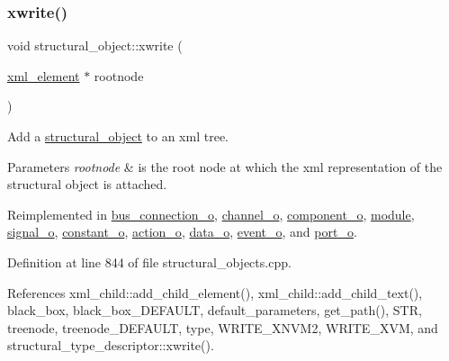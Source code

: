 \mbox{\label{classstructural__object_a7b0b509094451578b2dc10a9b716b16e}} 
\subsubsection{\texorpdfstring{xwrite()}{xwrite()}}
{\footnotesize\ttfamily void structural\+\_\+object\+::xwrite (\begin{DoxyParamCaption}\item[{\hyperlink{classxml__element}{xml\+\_\+element} $\ast$}]{rootnode }\end{DoxyParamCaption})\hspace{0.3cm}{\ttfamily [virtual]}}



Add a \hyperlink{classstructural__object}{structural\+\_\+object} to an xml tree. 


\begin{DoxyParams}{Parameters}
{\em rootnode} & is the root node at which the xml representation of the structural object is attached. \\
\hline
\end{DoxyParams}


Reimplemented in \hyperlink{classbus__connection__o_acb507e284b971944f09b6b26264dc0cf}{bus\+\_\+connection\+\_\+o}, \hyperlink{classchannel__o_aa9272c96bee02d7ef08ef3d589725a6d}{channel\+\_\+o}, \hyperlink{classcomponent__o_a96fc64957b68763fbfc946efdbc0249e}{component\+\_\+o}, \hyperlink{classmodule_acd60f65d5beaeed8a6728ea1cb506b74}{module}, \hyperlink{classsignal__o_af828ace28e381c16a88a79b330e2e5b2}{signal\+\_\+o}, \hyperlink{classconstant__o_a6d7224d9422459b095468da97fb8a4f0}{constant\+\_\+o}, \hyperlink{classaction__o_ace0907025534f0523c2f322a24f36ac8}{action\+\_\+o}, \hyperlink{classdata__o_a80c100b49475f7279913eed46a728366}{data\+\_\+o}, \hyperlink{classevent__o_a53240cc7c1bee201e995d027908afec9}{event\+\_\+o}, and \hyperlink{structport__o_a134c66609a971e40a34dfdea50eb57dd}{port\+\_\+o}.



Definition at line 844 of file structural\+\_\+objects.\+cpp.



References xml\+\_\+child\+::add\+\_\+child\+\_\+element(), xml\+\_\+child\+::add\+\_\+child\+\_\+text(), black\+\_\+box, black\+\_\+box\+\_\+\+D\+E\+F\+A\+U\+LT, default\+\_\+parameters, get\+\_\+path(), S\+TR, treenode, treenode\+\_\+\+D\+E\+F\+A\+U\+LT, type, W\+R\+I\+T\+E\+\_\+\+X\+N\+V\+M2, W\+R\+I\+T\+E\+\_\+\+X\+VM, and structural\+\_\+type\+\_\+descriptor\+::xwrite().



